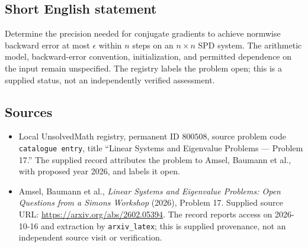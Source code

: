 \documentclass[11pt]{article}
\begin{document}
\subsection{Short English statement}
Determine the precision needed for conjugate gradients to achieve normwise backward error at most \(\epsilon\) within \(n\) steps on an \(n\times n\) SPD system. The arithmetic model, backward-error convention, initialization, and permitted dependence on the input remain unspecified. The registry labels the problem open; this is a supplied status, not an independently verified assessment.
\subsection{Sources}
\begin{itemize}
\item Local UnsolvedMath registry, permanent ID \(800508\), source problem code \texttt{catalogue entry}, title ``Linear Systems and Eigenvalue Problems --- Problem 17.'' The supplied record attributes the problem to Amsel, Baumann et al., with proposed year 2026, and labels it open.
\item Amsel, Baumann et al., \emph{Linear Systems and Eigenvalue Problems: Open Questions from a Simons Workshop} (2026), Problem 17. Supplied source URL: \url{https://arxiv.org/abs/2602.05394}. The record reports access on 2026-10-16 and extraction by \texttt{arxiv\_latex}; this is supplied provenance, not an independent source visit or verification.
\end{itemize}
\end{document}
